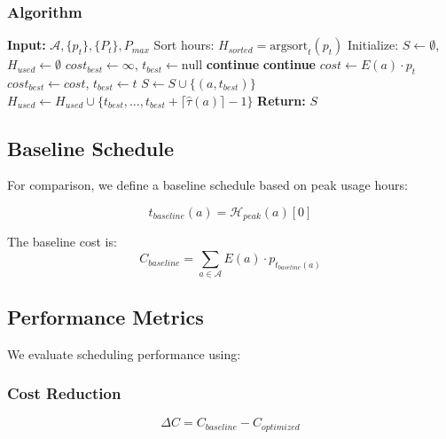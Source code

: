 \documentclass[conference]{IEEEtran}
\begin{document}
\subsubsection{Algorithm}
\begin{algorithm}
\caption{RL Greedy Scheduling}
\begin{algorithmic}[1]
\STATE \textbf{Input:} $\mathcal{A}, \{p_t\}, \{P_t\}, P_{max}$
\STATE Sort hours: $H_{sorted} = \text{argsort}_{t}(p_t)$
\STATE Initialize: $S \gets \emptyset$, $H_{used} \gets \emptyset$
    \STATE $cost_{best} \gets \infty$, $t_{best} \gets \text{null}$
            \STATE \textbf{continue}
        \ENDIF
            \STATE \textbf{continue}
        \ENDIF
        \STATE $cost \gets E(a) \cdot p_t$
            \STATE $cost_{best} \gets cost$, $t_{best} \gets t$
        \ENDIF
    \ENDFOR
        \STATE $S \gets S \cup \{(a, t_{best})\}$
        \STATE $H_{used} \gets H_{used} \cup \{t_{best}, \ldots, t_{best} + \lceil\hat{\tau}(a)\rceil - 1\}$
    \ENDIF
\ENDFOR
\STATE \textbf{Return:} $S$
\end{algorithmic}
\end{algorithm}

\subsection{Baseline Schedule}
For comparison, we define a baseline schedule based on peak usage hours:

\begin{equation}
t_{baseline}(a) = \mathcal{H}_{peak}(a)[0]
\end{equation}

The baseline cost is:
\begin{equation}
C_{baseline} = \sum_{a \in \mathcal{A}} E(a) \cdot p_{t_{baseline}(a)}
\end{equation}

\subsection{Performance Metrics}
We evaluate scheduling performance using:

\subsubsection{Cost Reduction}
\begin{equation}
\Delta C = C_{baseline} - C_{optimized}
\end{equation}
\end{document}

